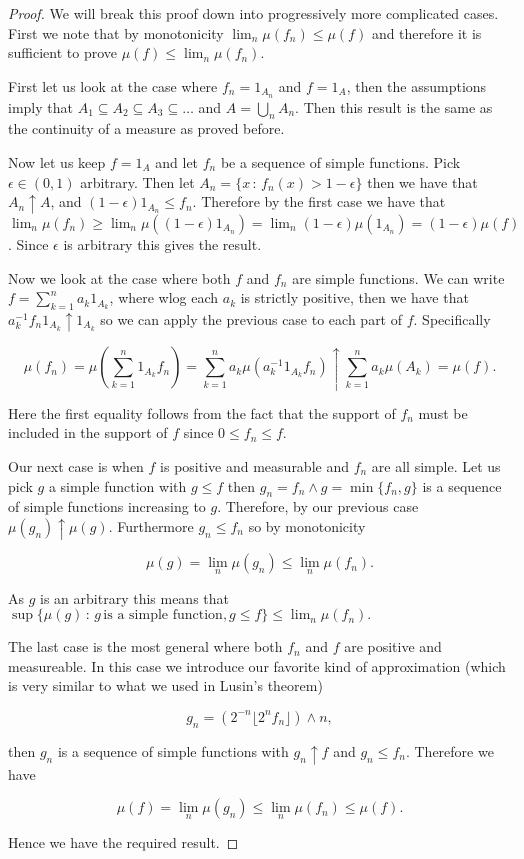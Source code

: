 \documentclass[
]{book}
\theoremstyle{definition}
\theoremstyle{definition}
\theoremstyle{definition}
\theoremstyle{definition}
\theoremstyle{remark}
\begin{document}
\begin{proof}
We will break this proof down into progressively more complicated cases. First we note that by monotonicity \(\lim_n \mu(f_n) \leq \mu(f)\) and therefore it is sufficient to prove \(\mu(f) \leq \lim_n \mu(f_n)\).

First let us look at the case where \(f_n = 1_{A_n}\) and \(f=1_{A}\), then the assumptions imply that \(A_1 \subseteq A_2 \subseteq A_3 \subseteq \dots\) and \(A= \bigcup_n A_n\). Then this result is the same as the continuity of a measure as proved before.

Now let us keep \(f=1_{A}\) and let \(f_n\) be a sequence of simple functions. Pick \(\epsilon \in (0,1)\) arbitrary. Then let \(A_n = \{ x\,:\, f_n(x)>1-\epsilon\}\) then we have that \(A_n \uparrow A\), and \((1-\epsilon)1_{A_n} \leq f_n\). Therefore by the first case we have that \(\lim_n \mu(f_n) \geq \lim_n \mu((1-\epsilon)1_{A_n}) = \lim_n (1-\epsilon) \mu(1_{A_n}) = (1-\epsilon) \mu(f)\). Since \(\epsilon\) is arbitrary this gives the result.

Now we look at the case where both \(f\) and \(f_n\) are simple functions. We can write \(f = \sum_{k=1}^n a_k 1_{A_k}\), where wlog each \(a_k\) is strictly positive, then we have that \(a_k^{-1} f_n 1_{A_k} \uparrow 1_{A_k}\) so we can apply the previous case to each part of \(f\). Specifically

\[ \mu(f_n) = \mu(\sum_{k=1}^n  1_{A_k}f_n) = \sum_{k=1}^n a_k \mu (a_k^{-1} 1_{A_k}f_n) \uparrow \sum_{k=1}^n a_k \mu(A_k) = \mu(f). \]

Here the first equality follows from the fact that the support of \(f_n\) must be included in the support of \(f\) since \(0 \leq f_n \leq f\).

Our next case is when \(f\) is positive and measurable and \(f_n\) are all simple. Let us pick \(g\) a simple function with \(g \leq f\) then \(g_n = f_n \wedge g = \min\{f_n, g\}\) is a sequence of simple functions increasing to \(g\). Therefore, by our previous case \(\mu(g_n) \uparrow \mu(g)\). Furthermore \(g_n \leq f_n\) so by monotonicity

\[\mu(g) =\lim_n \mu(g_n) \leq \lim_n \mu(f_n).\]

As \(g\) is an arbitrary this means that \(\sup\{\mu(g)\,:\, g \, \mbox{is a simple function}, g \leq f\} \leq \lim_n \mu(f_n).\)

The last case is the most general where both \(f_n\) and \(f\) are positive and measureable. In this case we introduce our favorite kind of approximation (which is very similar to what we used in Lusin's theorem)

\[ g_n = \left( 2^{-n} \lfloor 2^n f_n \rfloor \right) \wedge n, \]

then \(g_n\) is a sequence of simple functions with \(g_n \uparrow f\) and \(g_n \leq f_n\). Therefore we have

\[ \mu(f) = \lim_n \mu(g_n) \leq \lim_n \mu(f_n) \leq \mu(f). \]

Hence we have the required result.
\end{proof}
\end{document}
